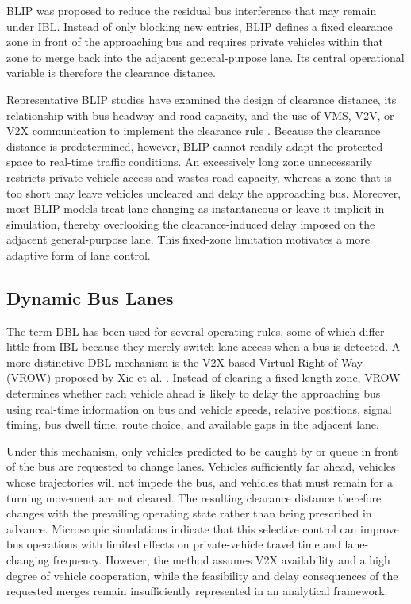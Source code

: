 BLIP was proposed to reduce the residual bus interference that may remain under IBL. Instead of only blocking new entries, BLIP defines a fixed clearance zone in front of the approaching bus and requires private vehicles within that zone to merge back into the adjacent general-purpose lane. Its central operational variable is therefore the clearance distance.

Representative BLIP studies have examined the design of clearance distance, its relationship with bus headway and road capacity, and the use of VMS, V2V, or V2X communication to implement the clearance rule \citep[e.g.,][]{eichler2006bus}. Because the clearance distance is predetermined, however, BLIP cannot readily adapt the protected space to real-time traffic conditions. An excessively long zone unnecessarily restricts private-vehicle access and wastes road capacity, whereas a zone that is too short may leave vehicles uncleared and delay the approaching bus. Moreover, most BLIP models treat lane changing as instantaneous or leave it implicit in simulation, thereby overlooking the clearance-induced delay imposed on the adjacent general-purpose lane. This fixed-zone limitation motivates a more adaptive form of lane control.

\subsection{Dynamic Bus Lanes}

The term DBL has been used for several operating rules, some of which differ little from IBL because they merely switch lane access when a bus is detected. A more distinctive DBL mechanism is the V2X-based Virtual Right of Way (VROW) proposed by Xie et al. \citep{xie2021design}. Instead of clearing a fixed-length zone, VROW determines whether each vehicle ahead is likely to delay the approaching bus using real-time information on bus and vehicle speeds, relative positions, signal timing, bus dwell time, route choice, and available gaps in the adjacent lane.

Under this mechanism, only vehicles predicted to be caught by or queue in front of the bus are requested to change lanes. Vehicles sufficiently far ahead, vehicles whose trajectories will not impede the bus, and vehicles that must remain for a turning movement are not cleared. The resulting clearance distance therefore changes with the prevailing operating state rather than being prescribed in advance. Microscopic simulations indicate that this selective control can improve bus operations with limited effects on private-vehicle travel time and lane-changing frequency. However, the method assumes V2X availability and a high degree of vehicle cooperation, while the feasibility and delay consequences of the requested merges remain insufficiently represented in an analytical framework.

